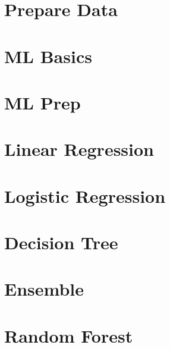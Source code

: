  \section[Prep]{Prepare Data}
 

\section[ML Basics]{ML Basics}




 \section[ML Prep]{ML Prep}



 \section[LinRegr]{Linear Regression}




 \section[LogiRegr]{Logistic Regression}





 \section[Tree]{Decision Tree}



 \section[Ensemble]{Ensemble}



 \section[RandomForest]{Random Forest}



